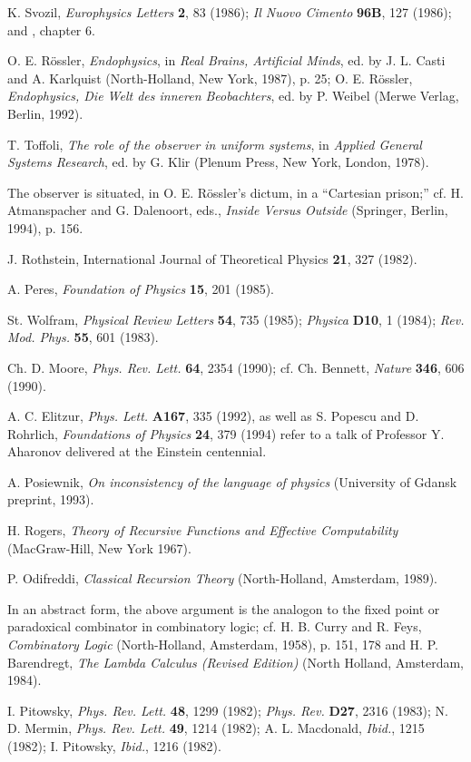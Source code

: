 \begin{thebibliography}{99}
K. Svozil,
{\sl Europhysics Letters} {\bf 2}, 83 (1986);
 {\sl Il Nuovo Cimento} {\bf 96B}, 127 (1986); and \cite{svozil-93},
chapter 6.

 O. E. R\"ossler, {\sl Endophysics}, in {\sl Real Brains, Artificial
 Minds}, ed. by J. L. Casti and A. Karlquist (North-Holland, New
 York, 1987), p. 25;
 O. E. R\"ossler, {\sl Endophysics, Die Welt des inneren Beobachters},
 ed. by P. Weibel (Merwe Verlag, Berlin, 1992).

 T. Toffoli,
{\sl The role of the observer in uniform systems}, in {\sl Applied
General Systems Research}, ed. by G. Klir (Plenum Press, New York,
London, 1978).

The observer is situated, in
O. E. R\"ossler's dictum, in a ``Cartesian prison;''
cf.
H. Atmanspacher
and G. Dalenoort, eds., {\sl Inside Versus Outside}
(Springer, Berlin, 1994), p. 156.


 J. Rothstein, International Journal of Theoretical Physics {\bf 21},
 327 (1982).

 A. Peres, {\sl Foundation of Physics} {\bf 15}, 201 (1985).

St. Wolfram, {\sl Physical Review Letters} {\bf 54}, 735 (1985);
{\sl Physica} {\bf D10}, 1 (1984);
{\sl Rev. Mod. Phys.} {\bf 55}, 601 (1983).


 Ch. D. Moore, {\sl Phys. Rev. Lett.} {\bf 64}, 2354 (1990);
cf. Ch. Bennett, {\sl Nature} {\bf 346}, 606 (1990).

A. C. Elitzur, {\sl Phys. Lett.} {\bf A167}, 335 (1992), as well as
S. Popescu and D. Rohrlich,
{\sl Foundations of Physics}
{\bf 24}, 379 (1994) refer to a talk of
Professor Y. Aharonov delivered at the Einstein centennial.


A. Posiewnik, {\sl On inconsistency of the language of physics}
(University of Gdansk preprint, 1993).


H. Rogers, {\sl Theory of Recursive Functions and Effective
Computability} (MacGraw-Hill, New York 1967).

P. Odifreddi, {\sl Classical Recursion Theory}
(North-Holland, Amsterdam, 1989).


In an abstract form, the above argument is the analogon to
the fixed point or paradoxical combinator in combinatory logic;
cf.
 H. B. Curry and R. Feys, {\sl Combinatory Logic} (North-Holland,
 Amsterdam, 1958),
p. 151, 178 and
 H. P. Barendregt, {\sl The Lambda Calculus (Revised Edition)}
 (North Holland, Amsterdam, 1984).

 I. Pitowsky, {\sl Phys.
 Rev. Lett.} {\bf 48}, 1299 (1982); {\sl Phys. Rev.} {\bf D27}, 2316
 (1983); N. D. Mermin, {\sl Phys. Rev. Lett.}
 {\bf 49}, 1214 (1982); A. L. Macdonald, {\it Ibid.}, 1215 (1982); I.
 Pitowsky, {\it Ibid.}, 1216 (1982).

\end{thebibliography}


